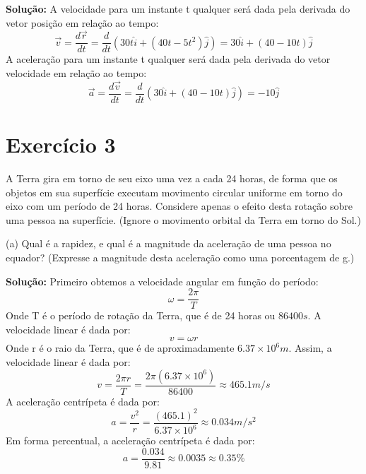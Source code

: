 \documentclass[12pt, a4paper]{article} %
\begin{document}
    \textbf{Solu\c{c}\~ao:}
    A velocidade para um instante t qualquer ser\'a dada pela derivada do vetor posi\c{c}\~ao em rela\c{c}\~ao ao tempo:
    \begin{equation}
        \overrightarrow{v} = \frac{d\overrightarrow{r}}{dt} = \frac{d}{dt}(30t \hat{i} + (40t - 5t^{2}) \hat{j}) = 30\hat{i} + (40 - 10t)\hat{j}
    \end{equation}
    A acelera\c{c}\~ao para um instante t qualquer ser\'a dada pela derivada do vetor velocidade em rela\c{c}\~ao ao tempo:
    \begin{equation}
        \overrightarrow{a} = \frac{d\overrightarrow{v}}{dt} = \frac{d}{dt}(30\hat{i} + (40 - 10t)\hat{j}) = -10\hat{j}
    \end{equation}

\section{Exerc\'icio 3}
    A Terra gira em torno de seu eixo uma vez a cada 24 horas, de forma que os objetos em sua superf\'icie executam movimento circular uniforme em torno do eixo com um per\'iodo de 24 horas. Considere apenas o efeito desta rota\c{c}\~ao sobre uma pessoa na superf\'icie. (Ignore o movimento orbital da Terra em torno do Sol.)
    
    (a) Qual \'e a rapidez, e qual \'e a magnitude da acelera\c{c}\~ao de uma pessoa no equador? (Expresse a magnitude desta acelera\c{c}\~ao como uma porcentagem de g.)

    \textbf{Solu\c{c}\~ao:}
    Primeiro obtemos a velocidade angular em fun\c{c}\~ao do per\'iodo:
    \begin{equation}
        \omega = \frac{2\pi}{T}
    \end{equation}
    Onde T \'e o per\'iodo de rota\c{c}\~ao da Terra, que \'e de 24 horas ou $86400s$.
    A velocidade linear \'e dada por:
    \begin{equation}
        v = \omega r
    \end{equation}
    Onde r \'e o raio da Terra, que \'e de aproximadamente $6.37 \times 10^{6}m$.
    Assim, a velocidade linear \'e dada por:
    \begin{equation}
        v = \frac{2\pi r}{T} = \frac{2\pi (6.37 \times 10^{6})}{86400} \approx 465.1 m/s
    \end{equation}
    A acelera\c{c}\~ao centr\'ipeta \'e dada por:
    \begin{equation}
        a = \frac{v^{2}}{r} = \frac{(465.1)^{2}}{6.37 \times 10^{6}} \approx 0.034 m/s^{2}
    \end{equation}
    Em forma percentual, a acelera\c{c}\~ao centr\'ipeta \'e dada por:
    \begin{equation}
        a = \frac{0.034}{9.81} \approx 0.0035 \approx 0.35\%
    \end{equation}
    
\end{document}
